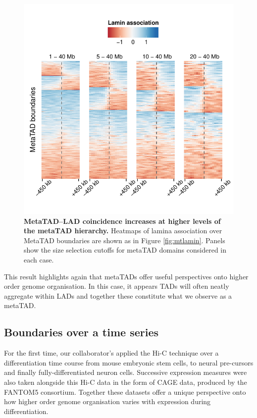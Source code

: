 \documentclass[a4paper,11pt,oneside]{book}
\begin{document}
\begin{figure}
\begin{center} 
\includegraphics[width=5in]{figs/mt_cutoffrange.pdf}
\captionsetup{width=\textwidth}
\caption[ MetaTAD--LAD coincidence increases at higher levels of the metaTAD hierarchy. ]{ {\bf MetaTAD--LAD coincidence increases at higher levels of the metaTAD hierarchy. }
Heatmaps of lamina association over MetaTAD boundaries are shown as in Figure \ref{fig:mtlamin}. Panels show the size selection cutoffs for metaTAD domains considered in each case.
}\label{fig:mtcutoffrange}
\end{center}
\end{figure} 

This result highlights again that metaTADs offer useful perspectives onto higher order genome organisation. In this case, it appears TADs will often neatly aggregate within LADs and together these constitute what we observe as a metaTAD.

\subsection{Boundaries over a time series}

For the first time, our collaborator's applied the Hi-C technique over a differentiation time course from mouse embryonic stem cells, to neural pre-cursors and finally fully-differentiated neuron cells. Successive expression measures were also taken alongside this Hi-C data in the form of CAGE data, produced by the FANTOM5 consortium.\cite{fantom5} Together these datasets offer a unique perspective onto how higher order genome organisation varies with expression during differentiation. 
\end{document}

